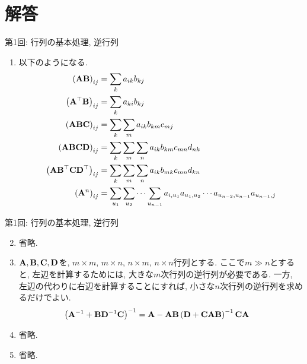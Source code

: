 \documentclass[dvipdfmx,notheorems,t]{beamer}
\begin{document}
\begin{frame}{}
\end{frame}

\section{解答}

\begin{frame}{第1回: 行列の基本処理, 逆行列}
\begin{enumerate}
  \item 以下のようになる.
  \begin{align*}
    \left( \vb{A} \vb{B} \right)_{ij} &= \sum_k a_{ik} b_{kj} \\
    \left( \vb{A}^\top \vb{B} \right)_{ij} &= \sum_k a_{ki} b_{kj} \\
    \left( \vb{A} \vb{B} \vb{C} \right)_{ij} &= \sum_k \sum_m a_{ik} b_{km} c_{mj} \\
    \left( \vb{A} \vb{B} \vb{C} \vb{D} \right)_{ij}
      &= \sum_k \sum_m \sum_n a_{ik} b_{km} c_{mn} d_{nk} \\
    \left( \vb{A} \vb{B}^\top \vb{C} \vb{D}^\top \right)_{ij}
      &= \sum_k \sum_m \sum_n a_{ik} b_{mk} c_{mn} d_{kn} \\
    \left( \vb{A}^n \right)_{ij}
      &= \sum_{u_1} \sum_{u_2} \cdots \sum_{u_{n - 1}}
        a_{i, u_1} a_{u_1, u_2} \cdots a_{u_{n - 2}, u_{n - 1}} a_{u_{n - 1}, j}
  \end{align*}
\end{enumerate}
\end{frame}

\begin{frame}{第1回: 行列の基本処理, 逆行列}
\begin{enumerate}
  \setcounter{enumi}{1}
  \item 省略.
  \item $\vb{A}, \vb{B}, \vb{C}, \vb{D}$を, $m \times m$, $m \times n$, $n \times m$, $n \times n$行列とする.
  ここで$m \gg n$とすると, 左辺を計算するためには, 大きな$m$次行列の逆行列が必要である.
  一方, 左辺の代わりに右辺を計算することにすれば, 小さな$n$次行列の逆行列を求めるだけでよい.
  \begin{align*}
    \left( \vb{A}^{-1} + \vb{B} \vb{D}^{-1} \vb{C} \right)^{-1}
      &= \vb{A} - \vb{A} \vb{B}
        \left( \vb{D} + \vb{C} \vb{A} \vb{B} \right)^{-1} \vb{C} \vb{A}
  \end{align*}
  \item 省略.
  \item 省略.
\end{enumerate}
\end{frame}
\end{document}
